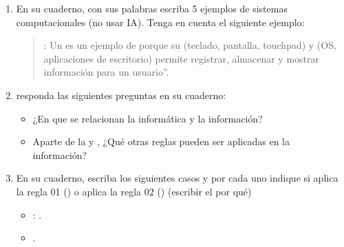 \documentclass[letterpaper,10pt,spanish]{sphinxmanual}
\begin{document}
\begin{enumerate}
\begin{itemize}
\end{itemize}

\item {} 
\sphinxAtStartPar
En su cuaderno, con sus palabras escriba 5 ejemplos de sistemas computacionales (no usar IA). Tenga en cuenta el siguiente ejemplo:
\begin{quote}

\sphinxAtStartPar
{}: Un  es un ejemplo de  porque su  (teclado, pantalla, touchpad) y  (OS, aplicaciones de escritorio) permite registrar, almacenar y mostrar información para un usuario”.
\end{quote}

\item {} 
\sphinxAtStartPar
responda las siguientes preguntas en su cuaderno:
\begin{itemize}
\item {} 
\sphinxAtStartPar
¿En que se relacionan la informática y la información?

\item {} 
\sphinxAtStartPar
Aparte de la  y , ¿Qué otras reglas pueden ser aplicadas en la información?

\end{itemize}

\item {} 
\sphinxAtStartPar
En su cuaderno, escriba los siguientes casos y por cada uno indique si aplica la regla 01 () o aplica la regla 02 () (escribir el por qué)
\begin{itemize}
\item {} 
\sphinxAtStartPar
{}: .

\item {} 
\sphinxAtStartPar
{} .


\end{itemize}
\end{enumerate}
\end{document}
